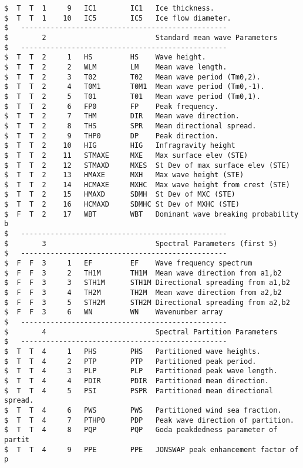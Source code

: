\begin{footnotesize}
\begin{verbatim}
$  T  T  1     9   IC1        IC1   Ice thickness.
$  T  T  1    10   IC5        IC5   Ice flow diameter.
$   -------------------------------------------------
$        2                          Standard mean wave Parameters
$   -------------------------------------------------
$  T  T  2     1   HS         HS    Wave height.
$  T  T  2     2   WLM        LM    Mean wave length.
$  T  T  2     3   T02        T02   Mean wave period (Tm0,2).
$  T  T  2     4   T0M1       T0M1  Mean wave period (Tm0,-1).
$  T  T  2     5   T01        T01   Mean wave period (Tm0,1).
$  T  T  2     6   FP0        FP    Peak frequency.
$  T  T  2     7   THM        DIR   Mean wave direction.
$  T  T  2     8   THS        SPR   Mean directional spread.
$  T  T  2     9   THP0       DP    Peak direction.
$  T  T  2    10   HIG        HIG   Infragravity height
$  T  T  2    11   STMAXE     MXE   Max surface elev (STE)
$  T  T  2    12   STMAXD     MXES  St Dev of max surface elev (STE)
$  T  T  2    13   HMAXE      MXH   Max wave height (STE)
$  T  T  2    14   HCMAXE     MXHC  Max wave height from crest (STE)
$  T  T  2    15   HMAXD      SDMH  St Dev of MXC (STE)
$  T  T  2    16   HCMAXD     SDMHC St Dev of MXHC (STE)
$  F  T  2    17   WBT        WBT   Dominant wave breaking probability b
$   -------------------------------------------------
$        3                          Spectral Parameters (first 5)
$   -------------------------------------------------
$  F  F  3     1   EF         EF    Wave frequency spectrum
$  F  F  3     2   TH1M       TH1M  Mean wave direction from a1,b2
$  F  F  3     3   STH1M      STH1M Directional spreading from a1,b2
$  F  F  3     4   TH2M       TH2M  Mean wave direction from a2,b2
$  F  F  3     5   STH2M      STH2M Directional spreading from a2,b2
$  F  F  3     6   WN         WN    Wavenumber array
$   -------------------------------------------------
$        4                          Spectral Partition Parameters 
$   -------------------------------------------------
$  T  T  4     1   PHS        PHS   Partitioned wave heights.
$  T  T  4     2   PTP        PTP   Partitioned peak period.
$  T  T  4     3   PLP        PLP   Partitioned peak wave length.
$  T  T  4     4   PDIR       PDIR  Partitioned mean direction.
$  T  T  4     5   PSI        PSPR  Partitioned mean directional spread.
$  T  T  4     6   PWS        PWS   Partitioned wind sea fraction.
$  T  T  4     7   PTHP0      PDP   Peak wave direction of partition.
$  T  T  4     8   PQP        PQP   Goda peakdedness parameter of partit
$  T  T  4     9   PPE        PPE   JONSWAP peak enhancement factor of p

\end{verbatim}
\end{footnotesize}
